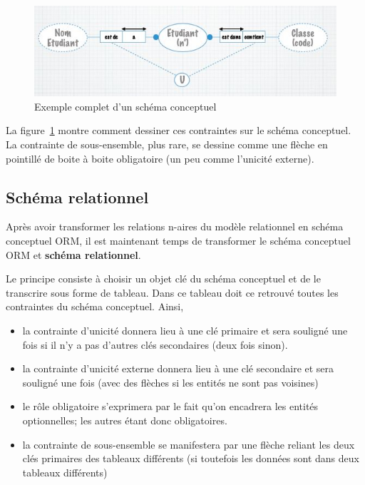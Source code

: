 \begin{figure}[h]
  \centering
  \includegraphics[scale=0.8]{schema_conceptuel_complet}
  \caption{Exemple complet d'un schéma conceptuel}
  \label{schema_conceptuel_complet}
\end{figure}

La figure~\ref{schema_conceptuel_complet} montre comment dessiner ces
contraintes sur le schéma conceptuel.
La contrainte de sous-ensemble, plus rare,
se dessine comme une flèche en pointillé de boite à boite obligatoire
(un peu comme l'unicité externe).


\subsection{Schéma relationnel}
Après avoir transformer les relations n-aires du modèle relationnel
en schéma conceptuel ORM,
il est maintenant temps de transformer le schéma conceptuel
ORM et \textbf{schéma relationnel}.

Le principe consiste à choisir un objet clé du schéma conceptuel
et de le transcrire sous forme de tableau.
Dans ce tableau doit ce retrouvé toutes les contraintes du schéma conceptuel.
Ainsi,
\begin{itemize}
  \item la contrainte d'unicité donnera lieu à une clé primaire et sera
    souligné une fois si il n'y a pas d'autres clés secondaires
    (deux fois sinon).
  \item la contrainte d'unicité externe donnera lieu à une clé secondaire et
    sera souligné une fois
    (avec des flèches si les entités ne sont pas voisines)
  \item le rôle obligatoire s'exprimera par le fait qu'on encadrera les entités
    optionnelles; les autres étant donc obligatoires.
  \item la contrainte de sous-ensemble se manifestera par une flèche reliant
    les deux clés primaires des tableaux différents
    (si toutefois les données sont dans deux tableaux différents)
\end{itemize}

